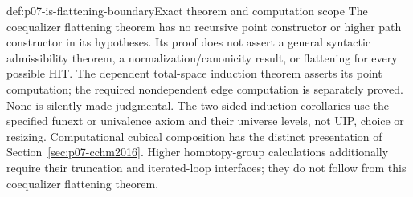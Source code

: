 \begin{proofboundary}{def:p07-is-flattening-boundary}{Exact theorem and computation scope}
The coequalizer flattening theorem has no recursive point constructor
or higher path constructor in its hypotheses. Its proof does not assert
a general syntactic admissibility theorem, a normalization/canonicity
result, or flattening for every possible HIT. The dependent total-space
induction theorem asserts its point computation; the required
nondependent edge computation is separately proved. None is silently
made judgmental. The two-sided induction corollaries use the specified
funext or univalence axiom and their universe levels, not UIP, choice
or resizing. Computational cubical composition has the distinct
presentation of Section~\ref{sec:p07-cchm2016}. Higher homotopy-group
calculations additionally require their truncation and iterated-loop
interfaces; they do not follow from this coequalizer flattening theorem.
\end{proofboundary}
